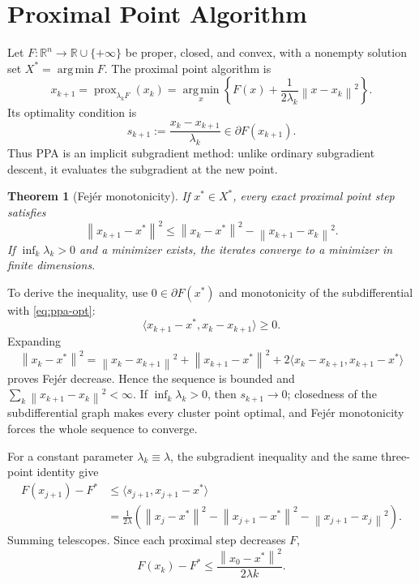 \documentclass[12pt,oneside]{book}
\numberwithin{equation}{section}
\theoremstyle{definition}
\theoremstyle{plain}
\newtheorem{theorem}{Theorem}[section]
\theoremstyle{remark}
\newcommand{\R}{\mathbb{R}}
\newcommand{\argmin}{\operatorname*{arg\,min}}
\newcommand{\norm}[1]{\left\lVert #1 \right\rVert}
\begin{document}
\section{Proximal Point Algorithm}

Let $F:\R^n\to\R\cup\{+\infty\}$ be proper, closed, and convex, with a
nonempty solution set $X^*=\argmin F$. The proximal point algorithm is
\begin{equation}
    x_{k+1}=\operatorname{prox}_{\lambda_k F}(x_k)
    =\argmin_x\left\{F(x)+\frac1{2\lambda_k}\norm{x-x_k}^2\right\}.
    \label{eq:ppa}
\end{equation}
Its optimality condition is
\begin{equation}\label{eq:ppa-opt}
 s_{k+1}:=\frac{x_k-x_{k+1}}{\lambda_k}\in\partial F(x_{k+1}).
\end{equation}
Thus PPA is an implicit subgradient method: unlike ordinary subgradient
descent, it evaluates the subgradient at the new point.

\begin{theorem}[Fejér monotonicity]
If $x^*\in X^*$, every exact proximal point step satisfies
\[
 \norm{x_{k+1}-x^*}^2
 \leq\norm{x_k-x^*}^2-\norm{x_{k+1}-x_k}^2.
\]
If $\inf_k\lambda_k>0$ and a minimizer exists, the iterates converge to a
minimizer in finite dimensions.
\end{theorem}

To derive the inequality, use $0\in\partial F(x^*)$ and monotonicity of the
subdifferential with \eqref{eq:ppa-opt}:
\[
 \langle x_{k+1}-x^*,x_k-x_{k+1}\rangle\geq0.
\]
Expanding
\[
 \norm{x_k-x^*}^2=\norm{x_k-x_{k+1}}^2
 +\norm{x_{k+1}-x^*}^2
 +2\langle x_k-x_{k+1},x_{k+1}-x^*\rangle
\]
proves Fejér decrease. Hence the sequence is bounded and
$\sum_k\norm{x_{k+1}-x_k}^2<\infty$. If $\inf_k\lambda_k>0$, then
$s_{k+1}\to0$; closedness of the subdifferential graph makes every cluster
point optimal, and Fejér monotonicity forces the whole sequence to converge.

For a constant parameter $\lambda_k\equiv\lambda$, the subgradient
inequality and the same three-point identity give
\begin{align*}
 F(x_{j+1})-F^*
 &\leq\langle s_{j+1},x_{j+1}-x^*\rangle\\
 &=\frac1{2\lambda}\left(\norm{x_j-x^*}^2
 -\norm{x_{j+1}-x^*}^2-\norm{x_{j+1}-x_j}^2\right).
\end{align*}
Summing telescopes. Since each proximal step decreases $F$,
\[
 F(x_k)-F^*\leq\frac{\norm{x_0-x^*}^2}{2\lambda k}.
\]
\end{document}
